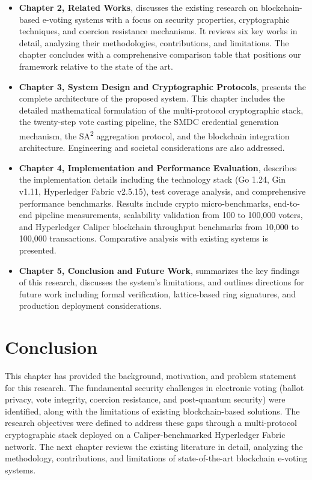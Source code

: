 \begin{itemize}
    \item \textbf{Chapter 2, Related Works}, discusses the existing research on blockchain-based e-voting systems with a focus on security properties, cryptographic techniques, and coercion resistance mechanisms. It reviews six key works in detail, analyzing their methodologies, contributions, and limitations. The chapter concludes with a comprehensive comparison table that positions our framework relative to the state of the art.
    
    \item \textbf{Chapter 3, System Design and Cryptographic Protocols}, presents the complete architecture of the proposed system. This chapter includes the detailed mathematical formulation of the multi-protocol cryptographic stack, the twenty-step vote casting pipeline, the SMDC credential generation mechanism, the SA\textsuperscript{2} aggregation protocol, and the blockchain integration architecture. Engineering and societal considerations are also addressed.
    
    \item \textbf{Chapter 4, Implementation and Performance Evaluation}, describes the implementation details including the technology stack (Go 1.24, Gin v1.11, Hyperledger Fabric v2.5.15), test coverage analysis, and comprehensive performance benchmarks. Results include crypto micro-benchmarks, end-to-end pipeline measurements, scalability validation from 100 to 100{,}000 voters, and Hyperledger Caliper blockchain throughput benchmarks from 10{,}000 to 100{,}000 transactions. Comparative analysis with existing systems is presented.
    
    \item \textbf{Chapter 5, Conclusion and Future Work}, summarizes the key findings of this research, discusses the system's limitations, and outlines directions for future work including formal verification, lattice-based ring signatures, and production deployment considerations.
\end{itemize}

\section{Conclusion}
\label{sec:intro-conclusion}

This chapter has provided the background, motivation, and problem statement for this research. The fundamental security challenges in electronic voting (ballot privacy, vote integrity, coercion resistance, and post-quantum security) were identified, along with the limitations of existing blockchain-based solutions. The research objectives were defined to address these gaps through a multi-protocol cryptographic stack deployed on a Caliper-benchmarked Hyperledger Fabric network. The next chapter reviews the existing literature in detail, analyzing the methodology, contributions, and limitations of state-of-the-art blockchain e-voting systems.
